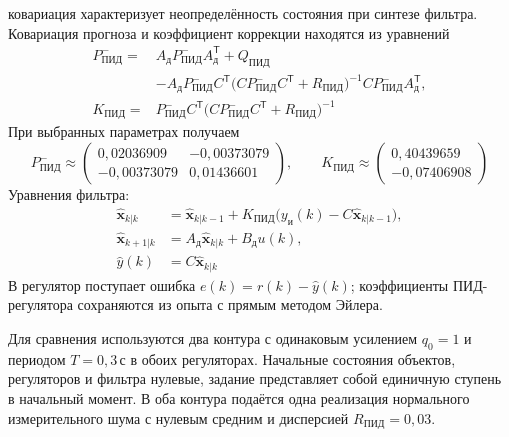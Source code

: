 ковариация характеризует неопределённость состояния при синтезе фильтра.
Ковариация прогноза и коэффициент коррекции находятся из уравнений
\begin{equation}
  \begin{aligned}
    P^-_{\text{ПИД}}={}&A_{\text{д}}P^-_{\text{ПИД}}A_{\text{д}}^{\mathsf T}
      +Q_{\text{ПИД}}\\
      &-A_{\text{д}}P^-_{\text{ПИД}}C^{\mathsf T}
        \bigl(CP^-_{\text{ПИД}}C^{\mathsf T}+R_{\text{ПИД}}\bigr)^{-1}
        CP^-_{\text{ПИД}}A_{\text{д}}^{\mathsf T},\\
    K_{\text{ПИД}}={}&P^-_{\text{ПИД}}C^{\mathsf T}
      \bigl(CP^-_{\text{ПИД}}C^{\mathsf T}+R_{\text{ПИД}}\bigr)^{-1}
  \end{aligned}
  \label{eq:temperature-riccati}
\end{equation}
При выбранных параметрах получаем
\begin{equation}
  P^-_{\text{ПИД}}\approx\begin{pmatrix}
    0{,}02036909&-0{,}00373079\\
    -0{,}00373079&0{,}01436601
  \end{pmatrix},
  \qquad
  K_{\text{ПИД}}\approx\begin{pmatrix}0{,}40439659\\-0{,}07406908\end{pmatrix}
  \label{eq:temperature-kalman-numeric}
\end{equation}
Уравнения фильтра:
\begin{equation}
  \begin{aligned}
    \hat{\bm x}_{k|k}
      &=\hat{\bm x}_{k|k-1}
        +K_{\text{ПИД}}\bigl(y_{\text{и}}(k)-C\hat{\bm x}_{k|k-1}\bigr),\\
    \hat{\bm x}_{k+1|k}&=A_{\text{д}}\hat{\bm x}_{k|k}+B_{\text{д}}u(k),\\
    \hat y(k)&=C\hat{\bm x}_{k|k}
  \end{aligned}
  \label{eq:temperature-kalman-algorithm}
\end{equation}
В регулятор поступает ошибка $e(k)=r(k)-\hat y(k)$;
коэффициенты ПИД-регулятора сохраняются из опыта с прямым методом Эйлера.

Для сравнения используются два контура с одинаковым усилением
$q_0=1$ и периодом $T=0{,}3\,\text{с}$ в обоих регуляторах.
Начальные состояния объектов, регуляторов и фильтра нулевые,
задание представляет собой единичную ступень в начальный момент.
В оба контура подаётся одна реализация нормального измерительного
шума с нулевым средним и дисперсией $R_{\text{ПИД}}=0{,}03$.

